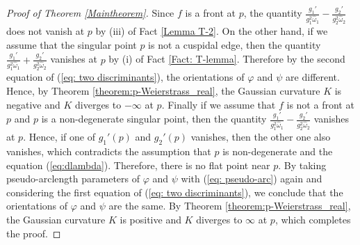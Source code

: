 \documentclass[11pt,reqno]{amsart}
\theoremstyle{plain} %
\theoremstyle{definition}
\begin{document}
\begin{proof}[Proof of Theorem \ref{Maintheorem}]
Since $f$ is a front at $p$, the quantity $\frac{g_1'}{g_1^2\hat{\omega}_1}-\frac{g_2'}{g_2^2\hat{\omega}_2}$ does not vanish at $p$ by (iii) of Fact \ref{Lemma T-2}. On the other hand, if we assume that the singular point $p$ is not a cuspidal edge, then the quantity $\frac{g_1'}{g_1^2\hat{\omega}_1}+\frac{g_2'}{g_2^2\hat{\omega}_2}$ vanishes at $p$ by (i) of Fact \ref{Fact: T-lemma}. Therefore by the second equation of (\ref{eq: two discriminants}), the orientations of $\varphi$ and $\psi$ are different. Hence, by Theorem \ref{theorem:p-Weierstrass_real}, the Gaussian curvature $K$ is negative and $K$ diverges to $-\infty$ at $p$. Finally if we assume that $f$ is not a front at $p$ and $p$ is a non-degenerate singular point, then the quantity $\frac{g_1'}{g_1^2\hat{\omega}_1}-\frac{g_2'}{g_2^2\hat{\omega}_2}$ vanishes at $p$. Hence, if one of $g_1'(p)$ and $g_2'(p)$ vanishes, then the other one also vanishes, which contradicts the assumption that $p$ is non-degenerate and the equation (\ref{eq:dlambda}). Therefore, there is no flat point near $p$. By taking pseudo-arclength parameters of $\varphi$ and $\psi$ with (\ref{eq: pseudo-arc}) again and considering the first equation of (\ref{eq: two discriminants}), we conclude that the orientations of $\varphi$ and $\psi$ are the same. By Theorem \ref{theorem:p-Weierstrass_real}, the Gaussian curvature $K$ is positive and $K$ diverges to $\infty$ at $p$, which completes the proof.
\end{proof}
\end{document}
